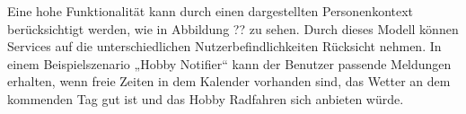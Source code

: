 Eine hohe Funktionalität kann durch einen dargestellten Personenkontext berücksichtigt werden, wie in Abbildung ?? zu sehen. Durch dieses Modell können Services auf die unterschiedlichen Nutzerbefindlichkeiten Rücksicht nehmen. In einem Beispielszenario „Hobby Notifier“ kann der Benutzer passende Meldungen erhalten, wenn freie Zeiten in dem Kalender vorhanden sind, das Wetter an dem kommenden Tag gut ist und das Hobby Radfahren sich anbieten würde.



